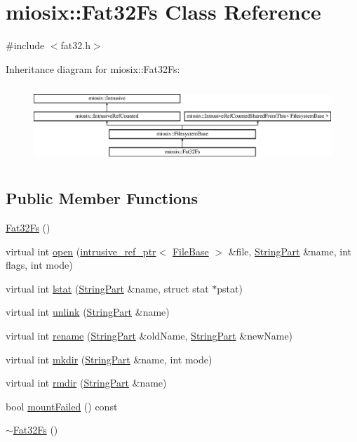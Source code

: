 \hypertarget{classmiosix_1_1_fat32_fs}{\section{miosix\-:\-:Fat32\-Fs Class Reference}
\label{classmiosix_1_1_fat32_fs}
}


{\ttfamily \#include $<$fat32.\-h$>$}

Inheritance diagram for miosix\-:\-:Fat32\-Fs\-:\begin{figure}[H]
\begin{center}
\leavevmode
\includegraphics[height=2.962963cm]{classmiosix_1_1_fat32_fs}
\end{center}
\end{figure}
\subsection*{Public Member Functions}
\begin{DoxyCompactItemize}
\item 
\hyperlink{classmiosix_1_1_fat32_fs_a8232572138de65ac3cd518371196f006}{Fat32\-Fs} ()
\item 
virtual int \hyperlink{classmiosix_1_1_fat32_fs_ad0c85f5f0c53342ab005f80e725a9533}{open} (\hyperlink{classmiosix_1_1intrusive__ref__ptr}{intrusive\-\_\-ref\-\_\-ptr}$<$ \hyperlink{classmiosix_1_1_file_base}{File\-Base} $>$ \&file, \hyperlink{classmiosix_1_1_string_part}{String\-Part} \&name, int flags, int mode)
\item 
virtual int \hyperlink{classmiosix_1_1_fat32_fs_ab31602401504dfc9550fc83a59ec0f6d}{lstat} (\hyperlink{classmiosix_1_1_string_part}{String\-Part} \&name, struct stat $\ast$pstat)
\item 
virtual int \hyperlink{classmiosix_1_1_fat32_fs_a422bdf2a4f7ec233ee851c13103e1b1d}{unlink} (\hyperlink{classmiosix_1_1_string_part}{String\-Part} \&name)
\item 
virtual int \hyperlink{classmiosix_1_1_fat32_fs_aa03f9f0a00ac17013cdc1cc990902913}{rename} (\hyperlink{classmiosix_1_1_string_part}{String\-Part} \&old\-Name, \hyperlink{classmiosix_1_1_string_part}{String\-Part} \&new\-Name)
\item 
virtual int \hyperlink{classmiosix_1_1_fat32_fs_ae33c37782ecd749ddb115277f3ae61a9}{mkdir} (\hyperlink{classmiosix_1_1_string_part}{String\-Part} \&name, int mode)
\item 
virtual int \hyperlink{classmiosix_1_1_fat32_fs_a14e40b5dfb8cb0d0c912d6ae761932a3}{rmdir} (\hyperlink{classmiosix_1_1_string_part}{String\-Part} \&name)
\item 
bool \hyperlink{classmiosix_1_1_fat32_fs_ae980abd1da7eaa9a2ea8485614e8bb2f}{mount\-Failed} () const 
\item 
\hyperlink{classmiosix_1_1_fat32_fs_a44458c12628cb06dc816e389a8f01989}{$\sim$\-Fat32\-Fs} ()
\end{DoxyCompactItemize}

